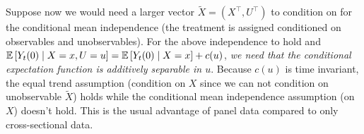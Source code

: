 \begin{remark}
    Suppose now we would need a larger vector $\tilde{X}=(X^\top,U^\top)$ to condition on for the conditional mean independence (the treatment is assigned conditioned on observables and unobservables).
    For the above independence to hold and $\mathbb{E}\left[Y_t(0) \mid X=x, U=u\right]= \mathbb{E}\left[Y_t(0) \mid X=x\right]+c(u)$, \textit{we need that the conditional expectation function is additively separable in $u$}.  Because $c(u)$ is time invariant, the equal trend assumption (condition on $X$ since we can not condition on unobservable $\tilde{X}$) holds while the conditional mean independence assumption (on $X$) doesn't hold.
    This is the usual advantage of panel data compared to only cross-sectional data.
\end{remark}

